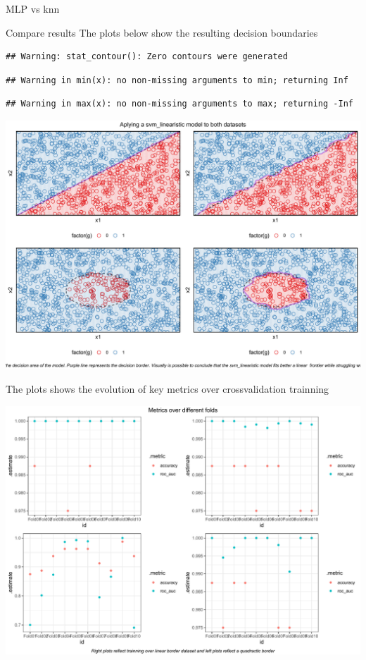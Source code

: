 \documentclass[
  ignorenonframetext,
]{article}
\begin{document}
\begin{frame}[fragile]{MLP vs knn}
\begin{block}{Compare results}
\protect\hypertarget{compare-results-6}{}
The plots below show the resulting decision boundaries

\begin{verbatim}
## Warning: stat_contour(): Zero contours were generated
\end{verbatim}

\begin{verbatim}
## Warning in min(x): no non-missing arguments to min; returning Inf
\end{verbatim}

\begin{verbatim}
## Warning in max(x): no non-missing arguments to max; returning -Inf
\end{verbatim}

\begin{center}\includegraphics{_main_files/figure-beamer/unnamed-chunk-94-1} \end{center}

The plots shows the evolution of key metrics over crossvalidation trainning

\begin{center}\includegraphics{_main_files/figure-beamer/unnamed-chunk-95-1} \end{center}


\end{block}
\end{frame}
\end{document}
